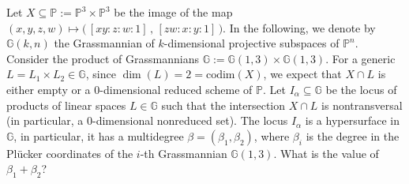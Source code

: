 Let $X\subseteq\mathbb{P}:=\mathbb{P}^3\times\mathbb{P}^3$ be the image of the map $(x,y,z,w) \mapsto \bigl(\,  [xy:z:w:1] \,,\,[zw:x:y:1]\, \bigr)$. In the following, we denote by $\mathbb{G}(k,n)$ the Grassmannian of $k$-dimensional projective subspaces of $\mathbb{P}^n$. Consider the product of Grassmannians $\mathbb{G}:=\mathbb{G}(1,3)\times\mathbb{G}(1,3)$. For a generic $L=L_1\times L_2\in\mathbb{G}$, since $\dim(L)=2=\mathrm{codim}(X)$, we expect that $X\cap L$ is either empty or a $0$-dimensional reduced scheme of $\mathbb{P}$. Let $I_\alpha\subseteq\mathbb{G}$ be the locus of products of linear spaces $L\in\mathbb{G}$ such that the intersection $X\cap L$ is nontransversal (in particular, a $0$-dimensional nonreduced set). The locus $I_\alpha$ is a hypersurface in $\mathbb{G}$, in particular, it has a multidegree $\beta=(\beta_1,\beta_2)$, where $\beta_i$ is the degree in the Pl\"ucker coordinates of the $i$-th Grassmannian $\mathbb{G}(1,3)$. What is the value of $\beta_1+\beta_2$?
